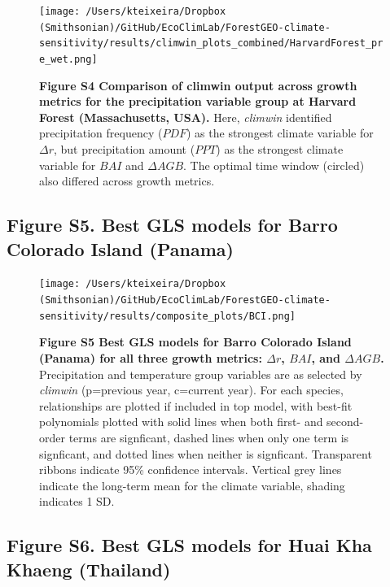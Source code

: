 \documentclass[
]{article}
\begin{document}
\begin{figure}
\centering
\texttt{[image: /Users/kteixeira/Dropbox (Smithsonian)/GitHub/EcoClimLab/ForestGEO-climate-sensitivity/results/climwin\_plots\_combined/HarvardForest\_pre\_wet.png]}
\caption{\textbf{Figure S4 \textbar{} Comparison of climwin output
across growth metrics for the precipitation variable group at Harvard
Forest (Massachusetts, USA).} Here, \emph{climwin} identified
precipitation frequency (\(PDF\)) as the strongest climate variable for
\(\Delta r\), but precipitation amount (\(PPT\)) as the strongest
climate variable for \(BAI\) and \(\Delta AGB\). The optimal time window
(circled) also differed across growth metrics.}
\end{figure}

\newpage

\hypertarget{figure-s5.-best-gls-models-for-barro-colorado-island-panama}{%
\subsection{Figure S5. Best GLS models for Barro Colorado Island
(Panama)}\label{figure-s5.-best-gls-models-for-barro-colorado-island-panama}}

\begin{figure}
\centering
\texttt{[image: /Users/kteixeira/Dropbox (Smithsonian)/GitHub/EcoClimLab/ForestGEO-climate-sensitivity/results/composite\_plots/BCI.png]}
\caption{\textbf{Figure S5 \textbar{} Best GLS models for Barro Colorado
Island (Panama) for all three growth metrics: \(\Delta r\), \(BAI\), and
\(\Delta AGB\).} Precipitation and temperature group variables are as
selected by \emph{climwin} (p=previous year, c=current year). For each
species, relationships are plotted if included in top model, with
best-fit polynomials plotted with solid lines when both first- and
second-order terms are signficant, dashed lines when only one term is
signficant, and dotted lines when neither is signficant. Transparent
ribbons indicate 95\% confidence intervals. Vertical grey lines indicate
the long-term mean for the climate variable, shading indicates 1 SD.}
\end{figure}

\newpage

\hypertarget{figure-s6.-best-gls-models-for-huai-kha-khaeng-thailand}{%
\subsection{Figure S6. Best GLS models for Huai Kha Khaeng
(Thailand)}\label{figure-s6.-best-gls-models-for-huai-kha-khaeng-thailand}}
\end{document}
